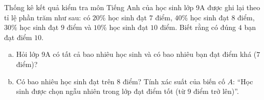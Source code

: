 \begin{bt}%
Thống kê kết quả kiểm tra môn Tiếng Anh của học sinh lớp 9A được ghi lại theo tỉ lệ phần trăm như sau: có $20\%$ học sinh đạt $7$ điểm, $40\%$ học sinh đạt $8$ điểm, $30\%$ học sinh đạt $9$ điểm và $10\%$ học sinh đạt $10$ điểm. Biết rằng có đúng $4$ bạn đạt điểm $10$.
\begin{enumerate}[a)]
    \item Hỏi lớp 9A có tất cả bao nhiêu học sinh và có bao nhiêu bạn đạt điểm khá ($7$ điểm)?
    \item Có bao nhiêu học sinh đạt trên $8$ điểm? Tính xác suất của biến cố $A$: ``Học sinh được chọn ngẫu nhiên trong lớp đạt điểm tốt (từ $9$ điểm trở lên)''.
\end{enumerate}
\end{bt}


